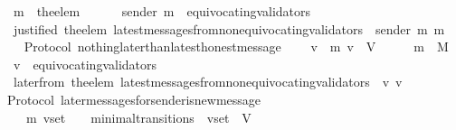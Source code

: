 \begin{isabellebody}
\ \ {\isasymlongrightarrow}\ m{\isacharprime}\ {\isacharequal}\ the{\isacharunderscore}elem\ {\isacharparenleft}{\isasymsigma}{\isacharprime}\ {\isacharminus}\ {\isasymsigma}{\isacharparenright}\isanewline
\ \ {\isasymlongrightarrow}\ sender\ m{\isacharprime}\ {\isasymnotin}\ equivocating{\isacharunderscore}validators\ {\isasymsigma}{\isacharprime}\isanewline
\ \ {\isasymlongrightarrow}\ justified\ {\isacharparenleft}the{\isacharunderscore}elem\ {\isacharparenleft}latest{\isacharunderscore}messages{\isacharunderscore}from{\isacharunderscore}non{\isacharunderscore}equivocating{\isacharunderscore}validators\ {\isasymsigma}\ {\isacharparenleft}sender\ m{\isacharprime}{\isacharparenright}{\isacharparenright}{\isacharparenright}\ m{\isacharprime}{\isachardoublequoteclose}\isanewline
%
\isadelimproof
\ \ %
\endisadelimproof
%
\isatagproof
{}\isamarkupfalse%
%
\endisatagproof
{\isafoldproof}%
%
\isadelimproof
\isanewline
%
\endisadelimproof
\isanewline
\isanewline
{}\isamarkupfalse%
\ {\isacharparenleft}\ Protocol{\isacharparenright}\ nothing{\isacharunderscore}later{\isacharunderscore}than{\isacharunderscore}latest{\isacharunderscore}honest{\isacharunderscore}message\ {\isacharcolon}\isanewline
\ \ {\isachardoublequoteopen}{\isasymforall}\ v\ {\isasymsigma}\ m{\isachardot}\ v\ {\isasymin}\ V\ {\isasymand}\ {\isasymsigma}\ {\isasymin}\ {\isasymSigma}\ {\isasymand}\ m\ {\isasymin}\ M\isanewline
\ \ {\isasymlongrightarrow}\ v\ {\isasymnotin}\ equivocating{\isacharunderscore}validators\ {\isasymsigma}{\isacharprime}\isanewline
\ \ {\isasymlongrightarrow}\ later{\isacharunderscore}from\ {\isacharparenleft}the{\isacharunderscore}elem\ {\isacharparenleft}latest{\isacharunderscore}messages{\isacharunderscore}from{\isacharunderscore}non{\isacharunderscore}equivocating{\isacharunderscore}validators\ {\isasymsigma}\ v{\isacharparenright}{\isacharcomma}\ v{\isacharcomma}\ {\isasymsigma}{\isacharparenright}\ {\isacharequal}\ \ {\isasymemptyset}{\isachardoublequoteclose}\isanewline
%
\isadelimproof
\ \ %
\endisadelimproof
%
\isatagproof
{}\isamarkupfalse%
%
\endisatagproof
{\isafoldproof}%
%
\isadelimproof
\isanewline
%
\endisadelimproof
\isanewline
\isanewline
{}\isamarkupfalse%
\ {\isacharparenleft}\ Protocol{\isacharparenright}\ later{\isacharunderscore}messages{\isacharunderscore}for{\isacharunderscore}sender{\isacharunderscore}is{\isacharunderscore}new{\isacharunderscore}message\ {\isacharcolon}\isanewline
\ \ {\isachardoublequoteopen}{\isasymforall}\ {\isasymsigma}\ {\isasymsigma}{\isacharprime}\ m{\isacharprime}\ v{\isacharunderscore}set{\isachardot}\ {\isacharparenleft}{\isasymsigma}{\isacharcomma}\ {\isasymsigma}{\isacharprime}{\isacharparenright}\ {\isasymin}\ minimal{\isacharunderscore}transitions\ {\isasymand}\ v{\isacharunderscore}set\ {\isasymsubseteq}\ V\isanewline

\end{isabellebody}
